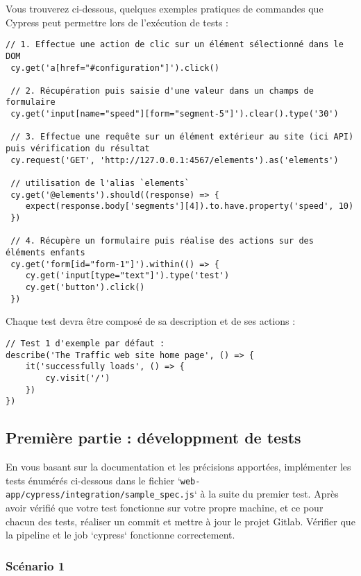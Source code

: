 \documentclass[11pt,a4paper,oneside]{article}
\begin{document}
Vous trouverez ci-dessous, quelques exemples pratiques de commandes que Cypress peut permettre lors de l'exécution de tests :
\begin{lstlisting}[style=customJava]
 // 1. Effectue une action de clic sur un élément sélectionné dans le DOM
 cy.get('a[href="#configuration"]').click()
		
 // 2. Récupération puis saisie d'une valeur dans un champs de formulaire
 cy.get('input[name="speed"][form="segment-5"]').clear().type('30')

 // 3. Effectue une requête sur un élément extérieur au site (ici API) puis vérification du résultat
 cy.request('GET', 'http://127.0.0.1:4567/elements').as('elements')

 // utilisation de l'alias `elements`
 cy.get('@elements').should((response) => {
 	expect(response.body['segments'][4]).to.have.property('speed', 10)
 })

 // 4. Récupère un formulaire puis réalise des actions sur des éléments enfants
 cy.get('form[id="form-1"]').within(() => {
	cy.get('input[type="text"]').type('test')
	cy.get('button').click()
 })
\end{lstlisting}

Chaque test devra être composé de sa description et de ses actions :

\begin{lstlisting}[style=customJava]
// Test 1 d'exemple par défaut :
describe('The Traffic web site home page', () => {
    it('successfully loads', () => {
        cy.visit('/')
    })
})
\end{lstlisting}

\subsection{Première partie : développment de tests}

En vous basant sur la documentation et les précisions apportées, implémenter les tests énumérés ci-dessous dans le fichier `\texttt{web-app/cypress/integration/sample\_spec.js}` à la suite du premier test. Après avoir vérifié que votre test fonctionne sur votre propre machine, et ce pour chacun des tests, réaliser un commit et mettre à jour le projet Gitlab. Vérifier que la pipeline et le job `cypress` fonctionne correctement.

\subsubsection{Scénario 1}
\end{document}
